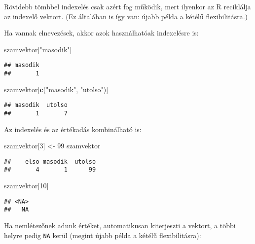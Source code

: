 \documentclass[]{book}
\newenvironment{Shaded}{\begin{snugshade}}{\end{snugshade}}
\newcommand{\DecValTok}[1]{\textcolor[rgb]{0.00,0.00,0.81}{#1}}
\newcommand{\KeywordTok}[1]{\textcolor[rgb]{0.13,0.29,0.53}{\textbf{#1}}}
\newcommand{\NormalTok}[1]{#1}
\newcommand{\StringTok}[1]{\textcolor[rgb]{0.31,0.60,0.02}{#1}}
\begin{document}
Rövidebb tömbbel indexelés csak azért fog működik, mert ilyenkor az R reciklálja az indexelő vektort. (Ez általában is így van: újabb példa a kétélű flexibilitásra.)

Ha vannak elnevezések, akkor azok használhatóak indexelésre is:

\begin{Shaded}
\begin{Highlighting}[]
\NormalTok{szamvektor[}\StringTok{"masodik"}\NormalTok{]}
\end{Highlighting}
\end{Shaded}

\begin{verbatim}
## masodik 
##       1
\end{verbatim}

\begin{Shaded}
\begin{Highlighting}[]
\NormalTok{szamvektor[}\KeywordTok{c}\NormalTok{(}\StringTok{"masodik"}\NormalTok{, }\StringTok{"utolso"}\NormalTok{)]}
\end{Highlighting}
\end{Shaded}

\begin{verbatim}
## masodik  utolso 
##       1       7
\end{verbatim}

Az indexelés és az értékadás kombinálható is:

\begin{Shaded}
\begin{Highlighting}[]
\NormalTok{szamvektor[}\DecValTok{3}\NormalTok{] <-}\StringTok{ }\DecValTok{99}
\NormalTok{szamvektor}
\end{Highlighting}
\end{Shaded}

\begin{verbatim}
##    elso masodik  utolso 
##       4       1      99
\end{verbatim}

\begin{Shaded}
\begin{Highlighting}[]
\NormalTok{szamvektor[}\DecValTok{10}\NormalTok{]}
\end{Highlighting}
\end{Shaded}

\begin{verbatim}
## <NA> 
##   NA
\end{verbatim}

Ha nemlétezőnek adunk értéket, automatikusan kiterjeszti a vektort, a többi helyre pedig \texttt{NA} kerül (megint újabb példa a kétélű flexibilitásra):
\end{document}
